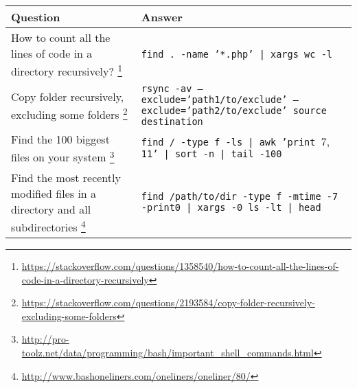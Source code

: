 \begin{center}
\begin{tabular}{p{3in}p{3in}}
    \textbf{Question} & \textbf{Answer} \\
    \hline \hline
    How to count all the lines of code in a directory recursively?%
        \footnote{\url{https://stackoverflow.com/questions/1358540/how-to-count-all-the-lines-of-code-in-a-directory-recursively}} &
        \texttt{find . -name '*.php' | xargs wc -l} \\
    \hline
    Copy folder recursively, excluding some folders%
        \footnote{\url{https://stackoverflow.com/questions/2193584/copy-folder-recursively-excluding-some-folders}} &
        \texttt{rsync -av --exclude='path1/to/exclude' --exclude='path2/to/exclude' source destination} \\
    \hline
    Find the 100 biggest files on your system%
        \footnote{\url{http://pro-toolz.net/data/programming/bash/important_shell_commands.html}}&
        \texttt{find / -type f -ls | awk '{print $7,$11}' | sort -n | tail -100} \\
    \hline
    Find the most recently modified files in a directory and all subdirectories%
        \footnote{\url{http://www.bashoneliners.com/oneliners/oneliner/80/}}&
        \texttt{find /path/to/dir -type f -mtime -7 -print0 | xargs -0 ls -lt | head} \\
\end{tabular}
\end{center}


